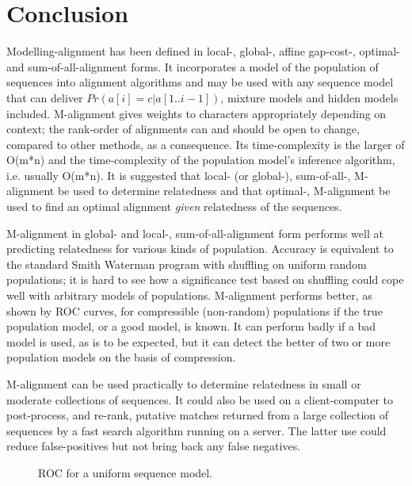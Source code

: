 \documentclass[letterpaper,11pt,oneside]{article}
\def\plotwidth{0.7\columnwidth}
\begin{document}
\section{Conclusion}
\label{sec:conc}


Modelling-alignment has been defined in local-, global-, affine gap-cost-,
optimal- and sum-of-all-alignment forms.  It incorporates a model of the
population of sequences into alignment algorithms and may be used with any
sequence model that can deliver $Pr(a[i]=c|a[1..i-1])$, mixture models and
hidden models included.  M-alignment gives weights to characters appropriately
depending on context; the rank-order of alignments can and should be open to
change, compared to other methods, as a consequence.  Its time-complexity is
the larger of O(m*n) and the time-complexity of the population model's
inference algorithm, i.e. usually O(m*n).  It is suggested that local- (or
global-), sum-of-all-, M-alignment be used to determine relatedness and that
optimal-, M-alignment be used to find an optimal alignment {\em given}
relatedness of the sequences.

M-alignment in global- and local-, sum-of-all-alignment form performs well
at predicting relatedness for various kinds of population.
Accuracy is equivalent to the standard Smith Waterman program with shuffling
on uniform random populations;
it is hard to see how a significance test based on shuffling could
cope well with arbitrary models of populations.
M-alignment performs better, as shown by ROC curves,
for compressible (non-random) populations if the true
population model, or a good model, is known.
It can perform badly if a bad model is used, as is to be expected,
but it can detect the better of two or more population models
on the basis of compression.

M-alignment can be used practically to determine relatedness
in small or moderate collections of sequences.
It could also be used on a client-computer to post-process, and re-rank,
putative matches returned from a large collection of sequences
by a fast search algorithm running on a server.
The latter use could reduce false-positives but not bring back
any false negatives.



\clearpage

\begin{figure}
\centering
\epsfig{file=roc_uni.eps, width=\plotwidth}
\caption{\label{fig:roc_uni}ROC for a uniform sequence model.}
\end{figure}
\end{document}
